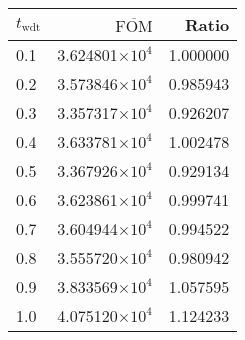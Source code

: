 \begin{tabular}{lrr}
\toprule
$t_{\mathrm{wdt}}$ & $\overline{\mathrm{FOM}}$ &    Ratio \\
\midrule
               0.1 &   3.624801$\times 10^{4}$ & 1.000000 \\
               0.2 &   3.573846$\times 10^{4}$ & 0.985943 \\
               0.3 &   3.357317$\times 10^{4}$ & 0.926207 \\
               0.4 &   3.633781$\times 10^{4}$ & 1.002478 \\
               0.5 &   3.367926$\times 10^{4}$ & 0.929134 \\
               0.6 &   3.623861$\times 10^{4}$ & 0.999741 \\
               0.7 &   3.604944$\times 10^{4}$ & 0.994522 \\
               0.8 &   3.555720$\times 10^{4}$ & 0.980942 \\
               0.9 &   3.833569$\times 10^{4}$ & 1.057595 \\
               1.0 &   4.075120$\times 10^{4}$ & 1.124233 \\
\bottomrule
\end{tabular}
